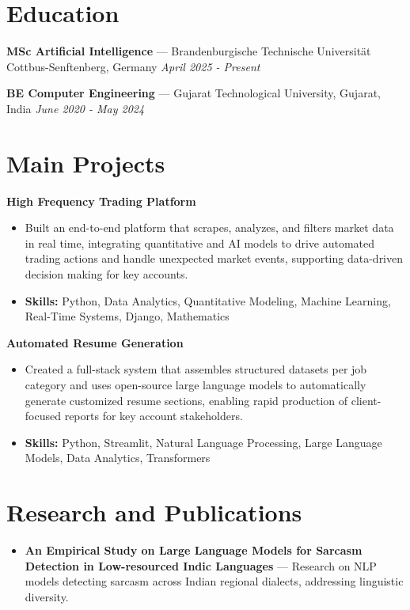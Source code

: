 \documentclass[a4paper,10pt]{article}
\begin{document}
\section*{Education}
\textbf{MSc Artificial Intelligence} — Brandenburgische Technische Universität Cottbus-Senftenberg, Germany \hfill \textit{April 2025 - Present}\par
\vspace{1.5pt}
\textbf{BE Computer Engineering} — Gujarat Technological University, Gujarat, India \hfill \textit{June 2020 - May 2024}\par

\section*{Main Projects}
\textbf{High Frequency Trading Platform}\par
\vspace{1pt}
\begin{itemize}
  \item Built an end-to-end platform that scrapes, analyzes, and filters market data in real time, integrating quantitative and AI models to drive automated trading actions and handle unexpected market events, supporting data-driven decision making for key accounts.
  \item \textbf{Skills:} Python, Data Analytics, Quantitative Modeling, Machine Learning, Real-Time Systems, Django, Mathematics
\end{itemize}
\vspace{3pt}
\textbf{Automated Resume Generation}\par
\vspace{1pt}
\begin{itemize}
  \item Created a full-stack system that assembles structured datasets per job category and uses open-source large language models to automatically generate customized resume sections, enabling rapid production of client-focused reports for key account stakeholders.
  \item \textbf{Skills:} Python, Streamlit, Natural Language Processing, Large Language Models, Data Analytics, Transformers
\end{itemize}

\section*{Research and Publications}
\begin{itemize}
\item \textbf{An Empirical Study on Large Language Models for Sarcasm Detection in Low-resourced Indic Languages} — Research on NLP models detecting sarcasm across Indian regional dialects, addressing linguistic diversity.
\end{itemize}
\end{document}
